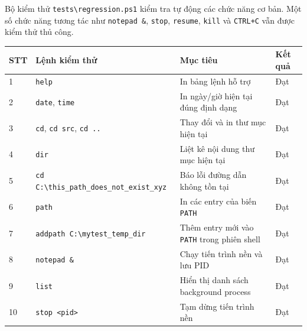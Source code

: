 \documentclass[13pt,a4paper,oneside]{extreport}
\begin{document}
Bộ kiểm thử \texttt{tests\textbackslash regression.ps1} kiểm tra tự động các chức năng cơ bản. Một số chức năng tương tác như \texttt{notepad \&}, \texttt{stop}, \texttt{resume}, \texttt{kill} và \texttt{CTRL+C} vẫn được kiểm thử thủ công.

\begin{longtable}{|p{1.2cm}|p{4.2cm}|p{5.4cm}|p{3.5cm}|}
	\hline
	\textbf{STT} & \textbf{Lệnh kiểm thử}                                         & \textbf{Mục tiêu}                                  & \textbf{Kết quả} \\
	\hline
	1            & \texttt{help}                                                  & In bảng lệnh hỗ trợ                                & Đạt              \\
	\hline
	2            & \texttt{date}, \texttt{time}                                   & In ngày/giờ hiện tại đúng định dạng                & Đạt              \\
	\hline
	3            & \texttt{cd}, \texttt{cd src}, \texttt{cd ..}                   & Thay đổi và in thư mục hiện tại                    & Đạt              \\
	\hline
	4            & \texttt{dir}                                                   & Liệt kê nội dung thư mục hiện tại                  & Đạt              \\
	\hline
	5            & \texttt{cd C:\textbackslash this\_path\_does\_not\_exist\_xyz} & Báo lỗi đường dẫn không tồn tại                    & Đạt              \\
	\hline
	6            & \texttt{path}                                                  & In các entry của biến \texttt{PATH}                & Đạt              \\
	\hline
	7            & \texttt{addpath C:\textbackslash mytest\_temp\_dir}            & Thêm entry mới vào \texttt{PATH} trong phiên shell & Đạt              \\
	\hline
	8            & \texttt{notepad \&}                                            & Chạy tiến trình nền và lưu PID                     & Đạt              \\
	\hline
	9            & \texttt{list}                                                  & Hiển thị danh sách background process              & Đạt              \\
	\hline
	10           & \texttt{stop <pid>}                                            & Tạm dừng tiến trình nền                            & Đạt              \\

\end{longtable}
\end{document}
